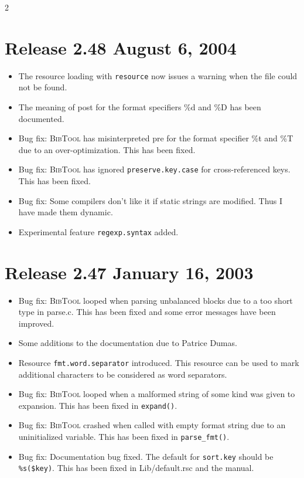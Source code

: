 \documentclass[11pt,a4paper]{scrartcl}
\newcommand\rsc[1]{\texttt{#1}}
\newcommand\File[1]{\textsf{#1}}
\newcommand\BibTool{\textsc{BibTool}}
\newenvironment{Releases}{\begin{multicols}2\RaggedRight}{\end{multicols}}
\newenvironment{Release}[2]{%
  \def\tmp{#2}%
  \section*{Release #1 \ifx\tmp\empty\else{\normalsize[#2]}\fi}
  \begin{itemize}
}{\end{itemize}}
\newenvironment{Fix}[1]{\item }{}
\newenvironment{New}[1]{\item }{}
\newenvironment{Doc}[1]{\item }{}
\begin{document}
\begin{Releases}
\begin{Release}{2.48}{August 6, 2004}
\begin{New}{gene}
    The resource loading with \rsc{resource} now issues a warning when
    the file could not be found.
  \end{New}
  \begin{Doc}{gene}
    The meaning of post for the format specifiers \%d and \%D has been
    documented.
  \end{Doc}
  \begin{Fix}{gene}
    Bug fix: \BibTool{} has misinterpreted pre for the format specifier
    \%t and \%T due to an over-optimization. This has been fixed.
  \end{Fix}
  \begin{Fix}{gene}
    Bug fix: \BibTool{} has ignored \rsc{preserve.key.case} for
    cross-referenced keys. This has been fixed.
  \end{Fix}
  \begin{Fix}{gene}
    Bug fix: Some compilers don't like it if static strings are
    modified. Thus I have made them dynamic.
  \end{Fix}
  \begin{New}{gene}
    Experimental feature \rsc{regexp.syntax} added.
  \end{New}
 \end{Release}

 \begin{Release}{2.47}{January 16, 2003}
  \begin{Fix}{gene}
    Bug fix: \BibTool{} looped when parsing unbalanced blocks due to a
    too short type in \File{parse.c}. This has been fixed and some
    error messages have been improved.
  \end{Fix}
  \begin{Doc}{gene}
    Some additions to the documentation due to Patrice Dumas.
  \end{Doc}
  \begin{New}{gene}
    Resource \rsc{fmt.word.separator} introduced. This resource can be
    used to mark additional characters to be considered as word
    separators.
  \end{New}
  \begin{Fix}{gene}
    Bug fix: \BibTool{} looped when a malformed string of some kind was
    given to expansion. This has been fixed in \verb|expand()|.
  \end{Fix}
  \begin{Fix}{gene}
    Bug fix: \BibTool{} crashed when called with empty format string
    due to an uninitialized variable. This has been fixed in
    \verb|parse_fmt()|.
  \end{Fix}
  \begin{Doc}{gene}
    Bug fix: Documentation bug fixed. The default for \rsc{sort.key}
    should be \verb|%s($key)|. This has been fixed in
    \File{Lib/default.rsc} and the manual.
  \end{Doc}
 \end{Release}


\end{Releases}
\end{document}
